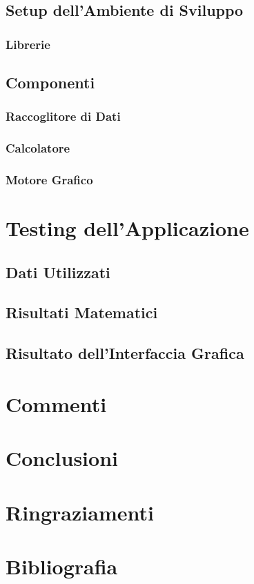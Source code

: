 \documentclass[a4paper,12pt]{report}
\begin{document}
\section{Setup dell'Ambiente di Sviluppo}
%
\subsection{Librerie}
%
\section{Componenti}
%
\subsection{Raccoglitore di Dati}
%
\subsection{Calcolatore}
%
\subsection{Motore Grafico}
%
\chapter{Testing dell'Applicazione}
%
\section{Dati Utilizzati}
%
\section{Risultati Matematici}
%
\section{Risultato dell'Interfaccia Grafica}
%
\chapter{Commenti}
%
\chapter{Conclusioni}
%
\chapter{Ringraziamenti}
%
\chapter{Bibliografia}
%
\end{document}
